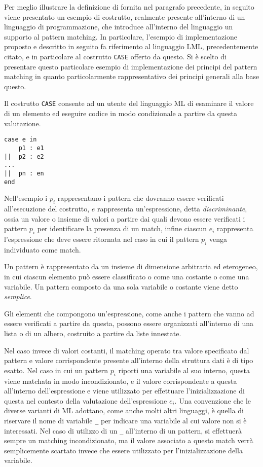 Per meglio illustrare la definizione di fornita nel paragrafo precedente, in
seguito viene presentato un esempio di costrutto, realmente presente
all'interno di un linguaggio di programmazione, che introduce all'interno del
linguaggio un supporto al pattern matching. In particolare, l'esempio di
implementazione proposto e descritto in seguito fa riferimento al linguaggio
LML, precedentemente citato, e in particolare al costrutto \texttt{CASE}
offerto da questo. Si è scelto di presentare questo particolare esempio di
implementazione dei principi del pattern matching in quanto particolarmente
rappresentativo dei principi generali alla base questo.

Il costrutto \texttt{CASE} consente ad un utente del linguaggio ML di esaminare
il valore di un elemento ed eseguire codice in modo condizionale a partire da
questa valutazione.

\begin{lstlisting}[caption=Il costrutto \texttt{CASE} presente in LML
  rappresenta un esempio di supporto al pattern matching.]
case e in
    p1 : e1
||  p2 : e2
...
||  pn : en
end
\end{lstlisting}

Nell'esempio i $p_i$ rappresentano i pattern che dovranno essere verificati
all’esecuzione del costrutto, $e$ rappresenta un’espressione, detta
\textit{discriminante}, ossia un valore o insieme di valori a partire dai quali
devono essere verificati i pattern $p_i$ per identificare la presenza di
un match, infine ciascun $e_i$ rappresenta l'espressione che deve essere
ritornata nel caso in cui il pattern $p_i$ venga individuato come match.

Un pattern è rappresentato da un insieme di dimensione arbitraria ed
eterogeneo, in cui ciascun elemento può essere classificato o come una costante
o come una variabile. Un pattern composto da una sola variabile o costante
viene detto \textit{semplice}.

Gli elementi che compongono un'espressione, come anche i pattern che vanno ad
essere verificati a partire da questa, possono essere organizzati all’interno
di una lista o di un albero, costruito a partire da liste innestate.

Nel caso invece di valori costanti, il matching operato tra valore specificato
dal pattern e valore corrispondente presente all'interno della struttura dati è
di tipo esatto. Nel caso in cui un pattern $p_i$ riporti una variabile al suo
interno, questa viene matchata in modo incondizionato, e il valore
corrispondente a questa all’interno dell’espressione e viene utilizzato per
effettuare l’inizializzazione di questa nel contesto della valutazione
dell'espressione $e_i$. Una convenzione che le diverse varianti di ML adottano,
come anche molti altri linguaggi, è quella di riservare il nome di variabile
\texttt{\_} per indicare una variabile al cui valore non si è interessati. Nel
caso di utilizzo di un \texttt{\_} all’interno di un pattern, si effettuerà
sempre un matching incondizionato, ma il valore associato a questo match verrà
semplicemente scartato invece che essere utilizzato per l’inizializzazione
della variabile.

